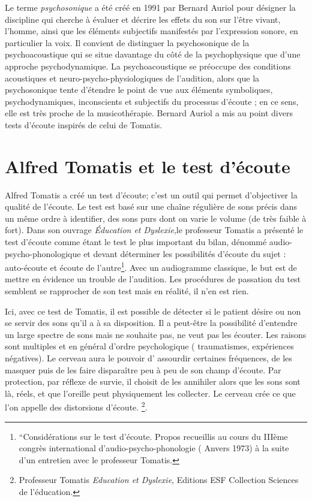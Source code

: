 Le terme \emph{psychosonique} a été créé en 1991 par Bernard Auriol pour
désigner la discipline qui cherche à évaluer et décrire les effets du
son sur l'être vivant, l'homme, ainsi que les éléments
subjectifs manifestés par l'expression sonore, en particulier la voix.
Il convient de distinguer la psychosonique de la psychoacoustique qui
se situe davantage du côté de la psychophysique que d'une approche
psychodynamique. La psychoacoustique se préoccupe des conditions
acoustiques et neuro-psycho-physiologiques de l'audition, alors que la
psychosonique tente d'étendre le point de vue aux éléments
symboliques, psychodynamiques, inconscients et subjectifs du processus
d'écoute ;  en ce sens, elle est très proche de la musicothérapie.
Bernard Auriol a mis au point divers tests d'écoute inspirés de celui de Tomatis.
  
\section{Alfred Tomatis et le test d'écoute}
  Alfred Tomatis a créé un test d'écoute; c'est un outil qui permet d'objectiver la qualité de l'écoute.
  Le test est  basé sur une chaîne régulière de sons précis dans un même ordre à identifier, des sons purs dont on varie le volume (de très faible à fort). Dans son ouvrage \emph{Éducation et Dyslexie},le professeur Tomatis
  a présenté le test d'écoute comme étant le test le plus important du
  bilan, dénommé audio-psycho-phonologique et devant déterminer les
  possibilités d'écoute du sujet : auto-écoute et écoute de
  l'autre\footnote{``Considérations sur le test d'écoute. Propos
  	recueillis au cours du IIIème congrès international
  	d'audio-psycho-phonologie ( Anvers 1973) à la suite d'un entretien
  	avec le professeur Tomatis.}. 
  Avec un audiogramme classique, le but est de mettre en évidence un trouble de l'audition. Les procédures de passation du test semblent se rapprocher de son test mais en réalité, il n'en est rien. 
  
  Ici, avec ce test de Tomatis, il est possible de détecter si le patient désire ou non se servir des sons
  qu'il a à sa disposition. Il a peut-être la possibilité d'entendre un large spectre de
  sons mais ne souhaite pas, ne veut pas les écouter. Les raisons sont multiples et en général d'ordre psychologique ( traumatismes,
  expériences négatives). Le cerveau aura le
  pouvoir d' assourdir certaines fréquences, de les masquer puis de les faire disparaître peu à peu de
  son champ d'écoute. Par protection, par réflexe de survie, il choisit de les
  annihiler alors que les sons sont là, réels, et que  l'oreille peut physiquement les collecter. Le cerveau crée ce
  que l'on appelle des distorsions d'écoute. \footnote{Professeur
    Tomatis \emph{Education et Dyslexie},  Editions ESF
    Collection Sciences de l'éducation.}. %

